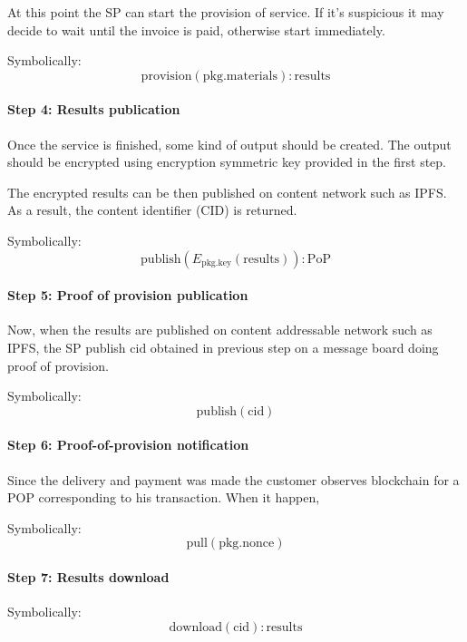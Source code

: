 \documentclass{ieeeaccess}
\begin{document}
At this point the SP can start the provision of service. If it's
suspicious it may decide to wait until the invoice is paid, otherwise
start immediately.

Symbolically: \[
\mathrm{provision}(\mathrm{pkg}.\mathrm{materials}) : \mathrm{results}
\]

\paragraph{Step 4: Results
publication}\label{step-4-results-publication}

Once the service is finished, some kind of output should be created. The
output should be encrypted using encryption symmetric key provided in
the first step.

The encrypted results can be then published on content network such as
IPFS. As a result, the content identifier (CID) is returned.

Symbolically: \[
 \mathrm{publish}(E_{\mathrm{pkg}.\mathrm{key}}(\mathrm{results})) : \mathrm{PoP}
\]

\paragraph{Step 5: Proof of provision
publication}\label{step-5-proof-of-provision-publication}

Now, when the results are published on content addressable network such
as IPFS, the SP publish \(\mathrm{cid}\) obtained in previous step on a
message board doing proof of provision.

Symbolically: \[\mathrm{publish}(\mathrm{cid})\]

\paragraph{Step 6: Proof-of-provision
notification}\label{step-6-proof-of-provision-notification}

Since the delivery and payment was made the customer observes blockchain
for a POP corresponding to his transaction. When it happen,

Symbolically: \[
\mathrm{pull}(\mathrm{pkg.nonce})
\]

\paragraph{Step 7: Results download}\label{step-7-results-download}

Symbolically: \[
\mathrm{download}(\mathrm{cid}) : \mathrm{results}
\]
\end{document}
